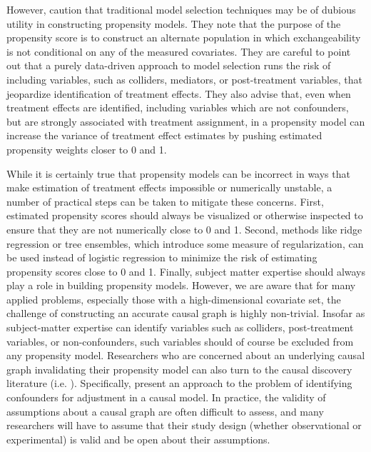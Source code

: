 \documentclass[aos]{imsart}
\begin{document}
However, \cite{hernan2020causal} caution that traditional model selection techniques may 
be of dubious utility in constructing propensity models. They note that the purpose of the propensity score is to construct an alternate population in which exchangeability is not 
conditional on any of the measured covariates. They are careful to point out that a purely data-driven approach to model selection runs the risk of including variables, such as 
colliders, mediators, or post-treatment variables, that jeopardize identification of treatment effects. They also advise that, even when treatment effects are identified, including 
variables which are not confounders, but are strongly associated with treatment assignment, in a propensity model can increase the variance of treatment effect estimates 
by pushing estimated propensity weights closer to 0 and 1.

While it is certainly true that propensity models can be incorrect in ways that make estimation of treatment effects impossible or numerically unstable, a number of practical steps 
can be taken to mitigate these concerns. First, estimated propensity scores should always be visualized or otherwise inspected to ensure that they are 
not numerically close to 0 and 1. Second, methods like ridge regression or tree ensembles, which introduce some measure of regularization, can be used instead of logistic regression 
to minimize the risk of estimating propensity scores close to 0 and 1. Finally, subject matter expertise should always play a role in building propensity models. However, we are aware that 
for many applied problems, especially those with a high-dimensional covariate set, the challenge of constructing an accurate causal graph is highly non-trivial. Insofar as subject-matter 
expertise can identify variables such as colliders, post-treatment variables, or non-confounders, such variables should of course be excluded from any propensity model. 
Researchers who are concerned about an underlying causal graph invalidating their propensity model can also turn to the causal discovery literature (i.e. \cite{peters2017elements}). Specifically, 
\cite{pmlr-v31-entner13a} present an approach to the problem of identifying confounders for adjustment in a causal model. In practice, the validity of assumptions about a causal graph 
are often difficult to assess, and many researchers will have to assume that their study design (whether observational or experimental) is valid and be open about their assumptions. 
\end{document}
